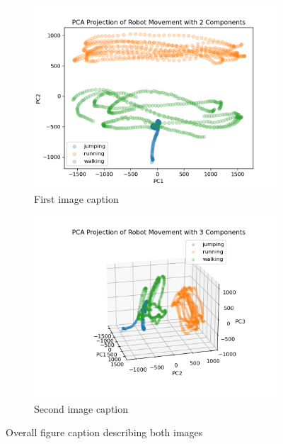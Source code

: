 \documentclass[11pt]{amsart}
\begin{document}
\begin{figure}[h]
    \centering
    \begin{subfigure}{0.4\textwidth}
        \centering
        \includegraphics[width=\textwidth]{../visualizations/pca_2_components_plot.png}
        \caption{First image caption}
        \label{fig:image1}
    \end{subfigure}
    \begin{subfigure}{0.49\textwidth}
        \centering
        \includegraphics[width=\textwidth]{../visualizations/pca_3_components_plot.png}
        \caption{Second image caption}
        \label{fig:image2}
    \end{subfigure}
    \caption{Overall figure caption describing both images}
    \label{fig:f1}
\end{figure}
\end{document}

